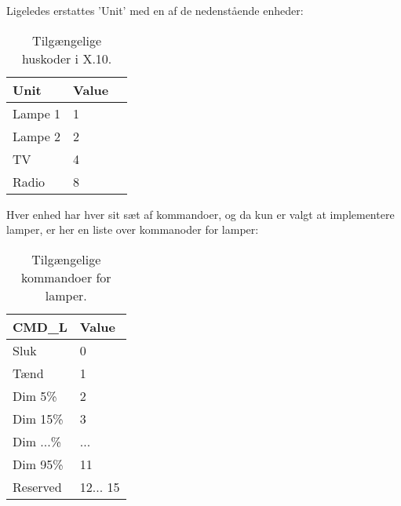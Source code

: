 Ligeledes erstattes 'Unit' med en af de nedenstående enheder:

\begin{table} [h]
\centering
    \begin{tabular}{|l|l|l|}
    \hline
    Unit    & Value   \\ \hline
    Lampe 1 & 1     \\ \hline
    Lampe 2 & 2      \\ \hline
    TV      & 4     \\ \hline
    Radio   & 8     \\ \hline
    \end{tabular}
\caption{Tilgængelige huskoder i X.10.}
\end{table}

Hver enhed har hver sit sæt af kommandoer, og da kun er valgt at implementere lamper, er her en liste over kommanoder for lamper:

\begin{table} [h]
\centering
    \begin{tabular}{|l|l|}
    \hline
    CMD\_L    & Value    \\ \hline
    Sluk      & 0        \\ \hline
    Tænd      & 1        \\ \hline
    Dim 5\%   & 2        \\ \hline
    Dim 15\%  & 3        \\ \hline
    Dim ...\% & ...      \\ \hline
    Dim 95\%  & 11       \\ \hline
    Reserved  & 12... 15 \\ \hline
    \end{tabular}
\caption{Tilgængelige kommandoer for lamper.}
\end{table}






